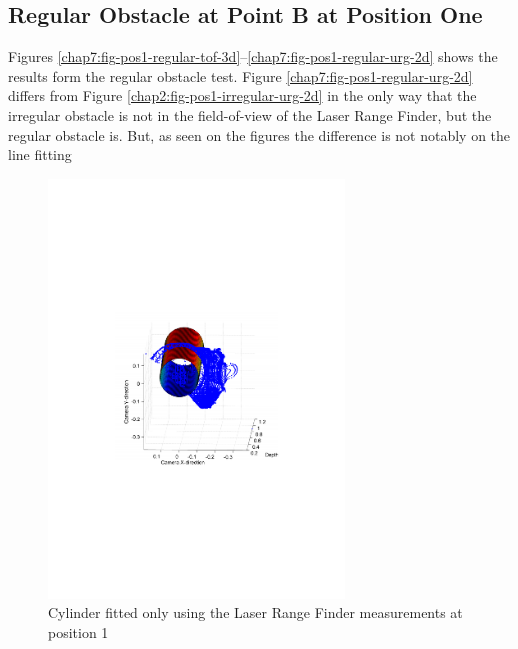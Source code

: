 \subsection{Regular Obstacle at Point B at Position One}
Figures \ref{chap7:fig-pos1-regular-tof-3d}--\ref{chap7:fig-pos1-regular-urg-2d} shows the
results form the regular obstacle test. Figure \ref{chap7:fig-pos1-regular-urg-2d} differs
from Figure \ref{chap2:fig-pos1-irregular-urg-2d} in the only way that the irregular
obstacle is not in the field-of-view of the Laser Range Finder, but the regular obstacle
is. But, as seen on the figures the difference is not notably on the line fitting
\begin{figure}[htbp]
    \centering
    \includegraphics[width=0.7\textwidth]{pics/pos1-regular-urg-3d}
    \caption{Cylinder fitted only using the Laser Range Finder measurements at position 1}
    \label{chap7:fig-pos1-regular-urg-3d}
\end{figure}
